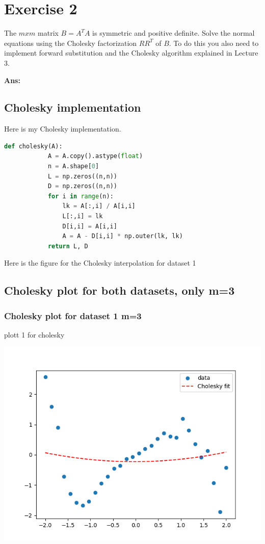 \documentclass[11pt]{article}
\newenvironment{solbox}
  {\begin{mdframed}[linewidth=1pt,linecolor=black,roundcorner=5pt]
   \noindent\textbf{Ans: }\enspace}
  {\end{mdframed}}
\begin{document}
\section{Exercise 2}

The $m x m$ matrix $B = A^T A$ is symmetric and positive definite. Solve the normal equations using the Cholesky factorization $RR^T$ of $B$. To do
this you also need to implement forward substitution and the Cholesky
algorithm explained in Lecture 3.


\begin{solbox}
    \subsection{Cholesky implementation}

    Here is my Cholesky implementation.



    \begin{lstlisting}[language=Python]
        def cholesky(A):
            A = A.copy().astype(float)
            n = A.shape[0]
            L = np.zeros((n,n))
            D = np.zeros((n,n))
            for i in range(n):
                lk = A[:,i] / A[i,i]
                L[:,i] = lk
                D[i,i] = A[i,i] 
                A = A - D[i,i] * np.outer(lk, lk)
            return L, D
    \end{lstlisting}

    Here is the figure for the Cholesky interpolation for dataset 1

    \subsection{Cholesky plot for both datasets, only  m=3}


    \subsubsection{Cholesky plot for dataset 1 m=3}
    

    plott 1 for cholesky
    \begin{center}
    \includegraphics[width=0.75\linewidth]{../Figures/M3Chol_plot_dataset1.png}
    \end{center}


\end{solbox}
\end{document}
